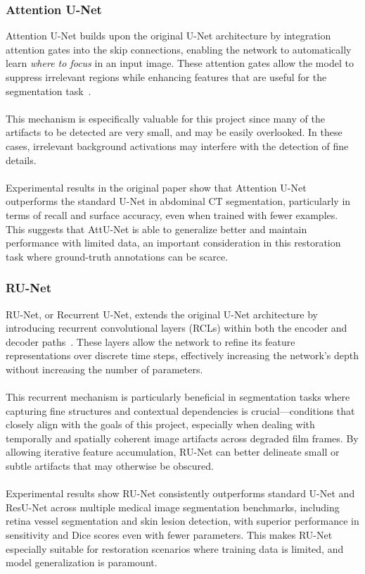 \documentclass[openany, 12pt]{article}
\begin{document}
	\subsubsection*{Attention U-Net}
	Attention U-Net builds upon the original U-Net architecture by integration attention gates into the skip connections, enabling the network to automatically learn \textit{where to focus} in an input image. These attention gates allow the model to suppress irrelevant regions while enhancing features that are useful for the segmentation task~\cite{oktay_attention_2018}.\\\\
	This mechanism is especifically valuable for this project since many of the artifacts to be detected are very small, and may be easily overlooked. In these cases, irrelevant background activations may interfere with the detection of fine details. \\\\
	Experimental results in the original paper show that Attention U-Net outperforms the standard U-Net in abdominal CT segmentation, particularly in terms of recall and surface accuracy, even when trained with fewer examples. This suggests that AttU-Net is able to generalize better and maintain performance with limited data, an important consideration in this restoration task where ground-truth annotations can be scarce. 
\subsubsection*{RU-Net} RU-Net, or Recurrent U-Net, extends the original U-Net architecture by introducing recurrent convolutional layers (RCLs) within both the encoder and decoder paths~\cite{alom_recurrent_2018}. These layers allow the network to refine its feature representations over discrete time steps, effectively increasing the network's depth without increasing the number of parameters.\\
\\
This recurrent mechanism is particularly beneficial in segmentation tasks where capturing fine structures and contextual dependencies is crucial—conditions that closely align with the goals of this project, especially when dealing with temporally and spatially coherent image artifacts across degraded film frames. By allowing iterative feature accumulation, RU-Net can better delineate small or subtle artifacts that may otherwise be obscured.\\
\\
Experimental results show RU-Net consistently outperforms standard U-Net and ResU-Net across multiple medical image segmentation benchmarks, including retina vessel segmentation and skin lesion detection, with superior performance in sensitivity and Dice scores even with fewer parameters. This makes RU-Net especially suitable for restoration scenarios where training data is limited, and model generalization is paramount.
\end{document}
